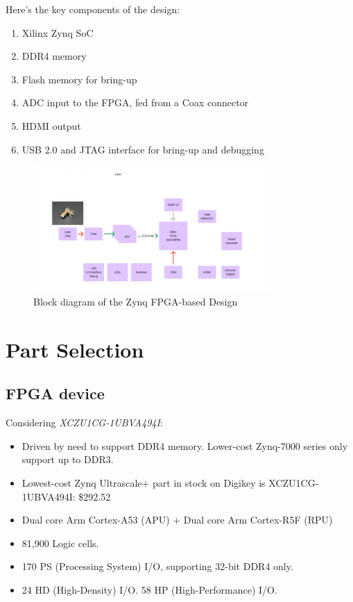 \documentclass{article}
\begin{document}
Here's the key components of the design:
\begin{enumerate}
    \item Xilinx Zynq SoC
    \item DDR4 memory
    \item Flash memory for bring-up
    \item ADC input to the FPGA, fed from a Coax connector
    \item HDMI output
    \item USB 2.0 and JTAG interface for bring-up and debugging
\end{enumerate}

\begin{figure}
    \centering
    \includegraphics[width=0.8\textwidth]{../pics/block-diagram.png}
    \caption{Block diagram of the Zynq FPGA-based Design}
    \label{fig:fpga-block-diagram}
\end{figure}

\section{Part Selection}

\subsection{FPGA device}

Considering {\em XCZU1CG-1UBVA494I}:
\begin{itemize}
    \item Driven by need to support DDR4 memory. Lower-cost Zynq-7000 series only support up to DDR3.
    \item Lowest-cost Zynq Ultrascale+ part in stock on Digikey is XCZU1CG-1UBVA494I: \$292.52
    \item Dual core Arm Cortex-A53 (APU) + Dual core Arm Cortex-R5F (RPU)
    \item 81,900 Logic cells.
    \item 170 PS (Processing System) I/O, supporting 32-bit DDR4 only.
    \item 24 HD (High-Density) I/O. 58 HP (High-Performance) I/O.
\end{itemize}
\end{document}
